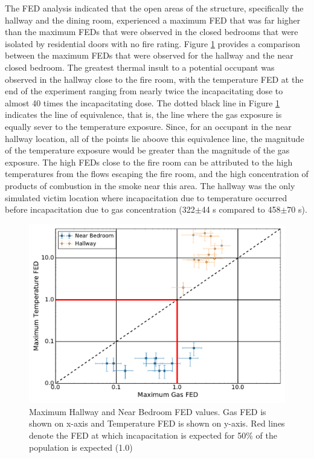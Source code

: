 \documentclass[12pt,oneside]{article}
\begin{document}
The FED analysis indicated that the open areas of the structure, specifically the hallway and the dining room, experienced a maximum FED that was far higher than the maximum FEDs that were observed in the closed bedrooms that were isolated by residential doors with no fire rating. Figure \ref{fig:near_FED_compare} provides a comparison between the maximum FEDs that were observed for the hallway and the near closed bedroom. The greatest thermal insult to a potential occupant was observed in the hallway close to the fire room, with the temperature FED at the end of the experiment ranging from nearly twice the incapacitating dose to almost 40 times the incapacitating dose. The dotted black line in Figure \ref{fig:near_FED_compare} indicates the line of equivalence, that is, the line where the gas exposure is equally sever to the temperature exposure. Since, for an occupant in the near hallway location, all of the points lie aboove this equivalence line, the magnitude of the temperature exposure would be greater than the magnitude of the gas exposure. The high FEDs close to the fire room can be attributed to the high temperatures from the flows escaping the fire room, and the high concentration of products of combustion in the smoke near this area. The hallway was the only simulated victim location where incapacitation due to temperature occurred before incapacitation due to gas concentration (322$\pm$44 s compared to 458$\pm$70 s).
\begin{figure}[!ht]	
	\centering
	\includegraphics[width=.75\textwidth]{../Figures/br_compare/Near}
	\caption[Maximum Hallway and Near Bedroom FED values]{Maximum Hallway and Near Bedroom FED values. Gas FED is shown on x-axis and Temperature FED is shown on y-axis. Red lines denote the FED at which incapacitation is expected for 50\% of the population is expected (1.0)}
	\label{fig:near_FED_compare}
\end{figure}
\end{document}
